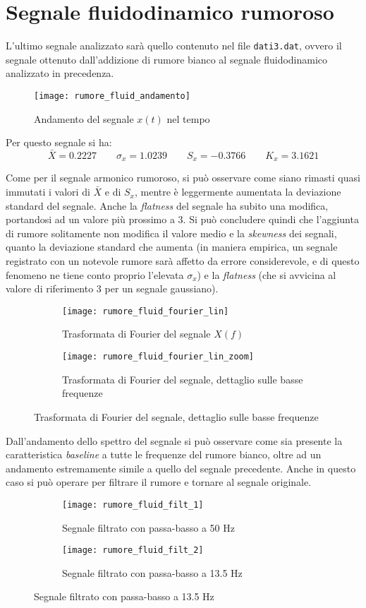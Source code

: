 \documentclass{article} %
\begin{document}
\section{Segnale fluidodinamico rumoroso}
L'ultimo segnale analizzato sarà quello contenuto nel file \texttt{dati3.dat}, ovvero il segnale ottenuto dall'addizione di rumore bianco al segnale fluidodinamico analizzato in precedenza.\par
\begin{figure}[ht!]
	\centering
	\texttt{[image: rumore\_fluid\_andamento]}
	\caption{Andamento del segnale $x(t)$ nel tempo}
\end{figure}
Per questo segnale si ha:
$$ \bar{X} = 0.2227 \qquad \sigma_{x} = 1.0239 \qquad S_{x} = -0.3766 \qquad K_{x} =  3.1621 $$\par
Come per il segnale armonico rumoroso, si può osservare come siano rimasti quasi immutati i valori di $\bar{X}$ e di $S_{x}$, mentre è leggermente aumentata la deviazione standard del segnale. Anche la \textit{flatness} del segnale ha subito una modifica, portandosi ad un valore più prossimo a 3. Si può concludere quindi che l'aggiunta di rumore solitamente non modifica il valore medio e la \textit{skewness} dei segnali, quanto la deviazione standard che aumenta (in maniera empirica, un segnale registrato con un notevole rumore sarà affetto da errore considerevole, e di questo fenomeno ne tiene conto proprio l'elevata $\sigma_x$) e la \textit{flatness} (che si avvicina al valore di riferimento 3 per un segnale gaussiano).
\begin{figure}[h!]
	\begin{subfigure}{0.5\textwidth}
		\texttt{[image: rumore\_fluid\_fourier\_lin]}
		\caption{Trasformata di Fourier del segnale $X(f)$}
	\end{subfigure}
	\begin{subfigure}{0.5\textwidth}
		\texttt{[image: rumore\_fluid\_fourier\_lin\_zoom]}
		\caption{Trasformata di Fourier del segnale, dettaglio sulle basse frequenze}
	\end{subfigure}
\end{figure}\par
Dall'andamento dello spettro del segnale si può osservare come sia presente la caratteristica \textit{baseline} a tutte le frequenze del rumore bianco, oltre ad un andamento estremamente simile a quello del segnale precedente. Anche in questo caso si può operare per filtrare il rumore e tornare al segnale originale.
\begin{figure}[h!]
	\begin{subfigure}{0.5\textwidth}
		\texttt{[image: rumore\_fluid\_filt\_1]}
		\caption{Segnale filtrato con passa-basso a 50 Hz}
	\end{subfigure}
	\begin{subfigure}{0.5\textwidth}
		\texttt{[image: rumore\_fluid\_filt\_2]}
		\caption{Segnale filtrato con passa-basso a 13.5 Hz}
	\end{subfigure}
\end{figure}\par
\end{document}
